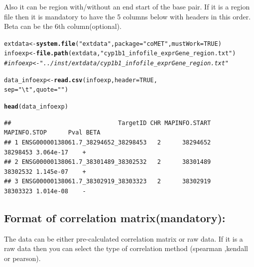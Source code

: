 \documentclass[11pt]{article}\usepackage[]{graphicx}\usepackage[usenames,dvipsnames]{color}
\makeatletter
\newcommand{\hlnum}[1]{\textcolor[rgb]{0.686,0.059,0.569}{#1}}%
\newcommand{\hlstr}[1]{\textcolor[rgb]{0.192,0.494,0.8}{#1}}%
\newcommand{\hlcom}[1]{\textcolor[rgb]{0.678,0.584,0.686}{\textit{#1}}}%
\newcommand{\hlstd}[1]{\textcolor[rgb]{0.345,0.345,0.345}{#1}}%
\newcommand{\hlkwb}[1]{\textcolor[rgb]{0.69,0.353,0.396}{#1}}%
\newcommand{\hlkwc}[1]{\textcolor[rgb]{0.333,0.667,0.333}{#1}}%
\newcommand{\hlkwd}[1]{\textcolor[rgb]{0.737,0.353,0.396}{\textbf{#1}}}%
\newenvironment{kframe}{%
 \def\at@end@of@kframe{}%
 \ifinner\ifhmode%
  \def\at@end@of@kframe{\end{minipage}}%
  \begin{minipage}{\columnwidth}%
 \fi\fi%
 \def\FrameCommand##1{\hskip\@totalleftmargin \hskip-\fboxsep
 \colorbox{shadecolor}{##1}\hskip-\fboxsep
     \hskip-\linewidth \hskip-\@totalleftmargin \hskip\columnwidth}%
 \MakeFramed {\advance\hsize-\width
   \@totalleftmargin\z@ \linewidth\hsize
   \@setminipage}}%
 {\par\unskip\endMakeFramed%
 \at@end@of@kframe}
\newenvironment{knitrout}{}{} %
\makeatother
\begin{document}
Also it can be region with/without an end start of the base pair. If it is a region file then it is mandatory to have the 5 columns below with headers in this order. Beta can be the 6th column(optional).

\begin{knitrout}
\color{fgcolor}\begin{kframe}
\begin{alltt}
\hlstd{extdata} \hlkwb{<-} \hlkwd{system.file}\hlstd{(}\hlstr{"extdata"}\hlstd{,} \hlkwc{package}\hlstd{=}\hlstr{"coMET"}\hlstd{,}\hlkwc{mustWork}\hlstd{=}\hlnum{TRUE}\hlstd{)}
\hlstd{infoexp} \hlkwb{<-} \hlkwd{file.path}\hlstd{(extdata,} \hlstr{"cyp1b1_infofile_exprGene_region.txt"}\hlstd{)}
\hlcom{#infoexp <- "../inst/extdata/cyp1b1_infofile_exprGene_region.txt" }

\hlstd{data_infoexp} \hlkwb{<-}\hlkwd{read.csv}\hlstd{(infoexp,} \hlkwc{header} \hlstd{=} \hlnum{TRUE}\hlstd{,}
                        \hlkwc{sep} \hlstd{=} \hlstr{"\textbackslash{}t"}\hlstd{,} \hlkwc{quote} \hlstd{=} \hlstr{""}\hlstd{)}

\hlkwd{head}\hlstd{(data_infoexp)}
\end{alltt}
\begin{verbatim}
##                              TargetID CHR MAPINFO.START MAPINFO.STOP      Pval BETA
## 1 ENSG00000138061.7_38294652_38298453   2      38294652     38298453 3.064e-17    +
## 2 ENSG00000138061.7_38301489_38302532   2      38301489     38302532 1.145e-07    +
## 3 ENSG00000138061.7_38302919_38303323   2      38302919     38303323 1.014e-08    -
\end{verbatim}
\end{kframe}
\end{knitrout}

\subsection{Format of correlation matrix(mandatory):}
The data can be either pre-calculated correlation matrix or raw data. If it is a raw data then you can select the type of correlation method (spearman ,kendall or pearson).
\end{document}
